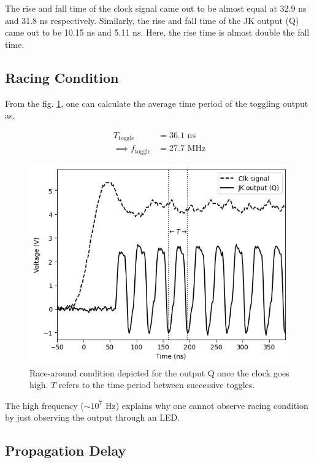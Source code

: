 The rise and fall time of the clock signal came out to be almost equal at 32.9 ns and 31.8 ns respectively.
Similarly, the rise and fall time of the JK output (Q) came out to be 10.15 ns and 5.11 ns. Here, the rise time is almost double the fall time.

\subsection*{Racing Condition}

From the fig. \ref{race-plot}, one can calculate the average time period of the toggling output as,

\begin{align*}
    T_\text{toggle} &= 36.1 \text{ ns}\\
    \implies f_\text{toggle} &= 27.7 \text{ MHz}
\end{align*}

\begin{figure}[H]
    \centering
    \includegraphics[width=0.95\columnwidth]{images/racing.png}
    \caption{Race-around condition depicted for the output Q once the clock goes high. $T$ refers to the time period between successive toggles.}
    \label{race-plot}
\end{figure}


The high frequency ($\sim 10^7$ Hz) explains why one cannot observe racing condition by just observing the output through an LED.

\subsection*{Propagation Delay}

